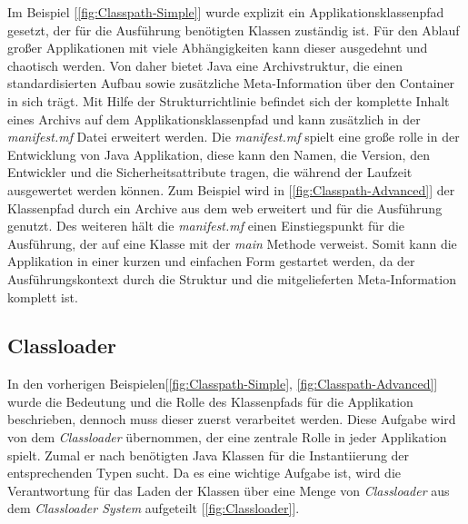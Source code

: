 Im Beispiel [\ref{fig:Classpath-Simple}] wurde explizit ein Applikationsklassenpfad gesetzt, der für die Ausführung benötigten Klassen zuständig ist. Für den Ablauf großer Applikationen mit viele Abhängigkeiten kann dieser ausgedehnt und chaotisch werden. Von daher bietet Java eine Archivstruktur, die einen standardisierten Aufbau sowie zusätzliche Meta-Information über den Container in sich trägt. Mit Hilfe der Strukturrichtlinie befindet sich der komplette Inhalt eines Archivs auf dem Applikationsklassenpfad und kann zusätzlich in der \textit{manifest.mf} Datei erweitert werden. Die \textit{manifest.mf} spielt eine große rolle in der Entwicklung von Java Applikation, diese kann den Namen, die Version, den Entwickler und die Sicherheitsattribute tragen, die während der Laufzeit ausgewertet werden können. Zum Beispiel wird in [\ref{fig:Classpath-Advanced}] der Klassenpfad durch ein Archive aus dem web erweitert und für die Ausführung genutzt. Des weiteren hält die \textit{manifest.mf} einen Einstiegspunkt für die Ausführung, der auf eine Klasse mit der \textit{main} Methode verweist. Somit kann die Applikation in einer kurzen und einfachen Form gestartet werden, da der Ausführungskontext durch die Struktur und die mitgelieferten Meta-Information komplett ist.

\subsection{Classloader}
\label{ssub:classloader}
In den vorherigen Beispielen[\ref{fig:Classpath-Simple}, \ref{fig:Classpath-Advanced}] wurde die Bedeutung und die Rolle des Klassenpfads für die Applikation beschrieben, dennoch muss dieser zuerst verarbeitet werden. Diese Aufgabe wird von dem \textit{Classloader} übernommen, der eine zentrale Rolle in jeder Applikation spielt. Zumal er nach benötigten Java Klassen für die Instantiierung der entsprechenden Typen sucht. Da es eine wichtige Aufgabe ist, wird die Verantwortung für das Laden der Klassen über eine Menge von \textit{Classloader} aus dem \textit{Classloader System} aufgeteilt [\ref{fig:Classloader}]. 

